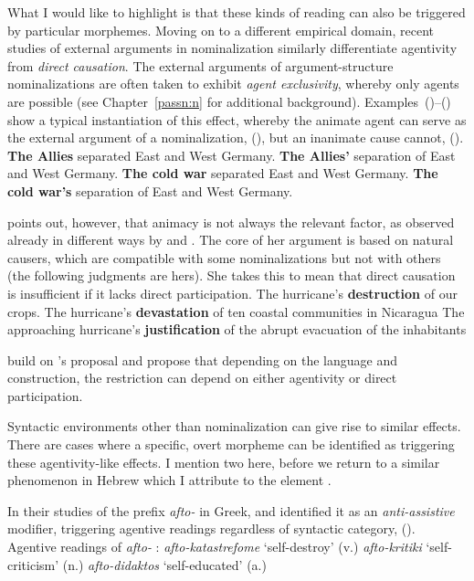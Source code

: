 {What I would like to highlight is that these kinds of reading can also be triggered by particular morphemes. Moving on to a different empirical domain, recent studies of external arguments in nominalization \citep{sichel10n,alexiadouetal13,ahdout18nom} similarly differentiate agentivity from \emph{direct causation}. The external arguments of argument-structure nominalizations are often taken to exhibit \emph{agent exclusivity}, whereby only agents are possible (see Chapter~\ref{passn:n} for additional background). Examples~(\nextx)--(\anextx) show a typical instantiation of this effect, whereby the animate agent can serve as the external argument of a nominalization, (\nextx), but an inanimate cause cannot, (\anextx).
\pex
	\a \textbf{The Allies} separated East and West Germany.
	\a \textbf{The Allies'} separation of East and West Germany.
\xe
\pex
	\a \textbf{The cold war} separated East and West Germany.
	\a \ljudge{\#}\textbf{The cold war's} separation of East and West Germany.
\xe

\cite{sichel10n} points out, however, that animacy is not always the relevant factor, as observed already in different ways by \cite{pesetsky95} and \cite{marantz97}. The core of her argument is based on natural causers, which are compatible with some nominalizations but not with others (the following judgments are hers). She takes this to mean that direct causation is insufficient if it lacks direct participation.
\pex
	\a The hurricane's \textbf{destruction} of our crops.
	\a The hurricane's \textbf{devastation} of ten coastal communities in Nicaragua
\xe
\ex \ljudge{\#} The approaching hurricane's \textbf{justification} of the abrupt evacuation of the inhabitants
\xe

\cite{alexiadouetal13,alexiadouetal13jcgl} build on \citeauthor{sichel10n}'s proposal and propose that depending on the language and construction, the restriction can depend on either agentivity or direct participation.

Syntactic environments other than nominalization can give rise to similar effects. There are cases where a specific, overt morpheme can be identified as triggering these agentivity-like effects. I mention two here, before we return to a similar phenomenon in Hebrew which I attribute to the element {\va}.

In their studies of the prefix \emph{afto-} in Greek, \cite{alexiadouafto} and \cite{spathasetal15} identified it as an \emph{anti-assistive} modifier, triggering agentive readings regardless of syntactic category, (\nextx).
\pex Agentive readings of \emph{afto-} \citep[61]{alexiadouafto}:
	\a \emph{afto-katastrefome} `self-destroy' (v.)
	\a \emph{afto-kritiki} `self-criticism' (n.)
	\a \emph{afto-didaktos} `self-educated' (a.)
\xe

}
